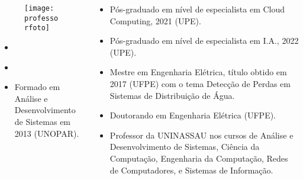 \begin{frame}[t]

    \begin{columns}[onlytextwidth,T]

        \begin{column}[T]{0.48\linewidth}
            \begin{figure}[htb]
              \centering{}
              \texttt{[image: \\professorfoto]}

              \textbf{\href{\professorlattes}{\professor}}
            \end{figure}

            \begin{itemize}
              \justifying{}
              \setlength\itemsep{1em}
              \item \href{\professorsite}{\professorsite}
              \item \href{\professorlattes}{\professorlattes}
              \item Formado em Análise e Desenvolvimento de Sistemas em 2013 (UNOPAR).
            \end{itemize}
        \end{column}

        \begin{column}{0.48\linewidth}
            \small
            \begin{itemize}\small
                \justifying{}
                \item Pós-graduado em nível de especialista em Cloud Computing, 2021 (UPE).
                \item Pós-graduado em nível de especialista em I.A., 2022 (UPE).
                \item Mestre em Engenharia Elétrica, título obtido em 2017 (UFPE) com o tema Detecção de Perdas em Sistemas de Distribuição de Água.
                \item Doutorando em Engenharia Elétrica (UFPE).
                \item Professor da UNINASSAU nos cursos de Análise e Desenvolvimento de Sistemas, Ciência da Computação, Engenharia da Computação, Redes de Computadores, e Sistemas de Informação.
            \end{itemize}
        \end{column}

    \end{columns}

\end{frame}

